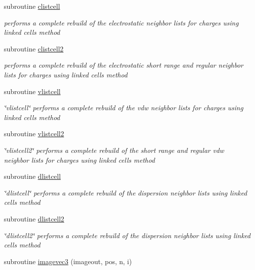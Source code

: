 \begin{DoxyCompactItemize}
subroutine \hyperlink{nblist_8f90_a7ecdd55bf7bb90d3317f841e9c7aecab}{clistcell}
\begin{DoxyCompactList}\small\item\em performs a complete rebuild of the electrostatic neighbor lists for charges using linked cells method \end{DoxyCompactList}\item 
subroutine \hyperlink{nblist_8f90_a28bbb96a7701996ad2c2c55343885868}{clistcell2}
\begin{DoxyCompactList}\small\item\em performs a complete rebuild of the electrostatic short range and regular neighbor lists for charges using linked cells method \end{DoxyCompactList}\item 
subroutine \hyperlink{nblist_8f90_aa00fc79e22f2780064cd297d93020255}{vlistcell}
\begin{DoxyCompactList}\small\item\em \char`\"{}vlistcell\char`\"{} performs a complete rebuild of the vdw neighbor lists for charges using linked cells method \end{DoxyCompactList}\item 
subroutine \hyperlink{nblist_8f90_a63b97da477dbb808921524d107be183f}{vlistcell2}
\begin{DoxyCompactList}\small\item\em \char`\"{}vlistcell2\char`\"{} performs a complete rebuild of the short range and regular vdw neighbor lists for charges using linked cells method \end{DoxyCompactList}\item 
subroutine \hyperlink{nblist_8f90_aa7e4cfbc56d2faec2b489ee2c98bb4eb}{dlistcell}
\begin{DoxyCompactList}\small\item\em \char`\"{}dlistcell\char`\"{} performs a complete rebuild of the dispersion neighbor lists using linked cells method \end{DoxyCompactList}\item 
subroutine \hyperlink{nblist_8f90_a09e052cf559bb7500727a656dacd2acb}{dlistcell2}
\begin{DoxyCompactList}\small\item\em \char`\"{}dlistcell2\char`\"{} performs a complete rebuild of the dispersion neighbor lists using linked cells method \end{DoxyCompactList}\item 
subroutine \hyperlink{nblist_8f90_a505da35963bd483400cb13ecf7180681}{imagevec3} (imageout, pos, n, i)
\end{DoxyCompactItemize}


